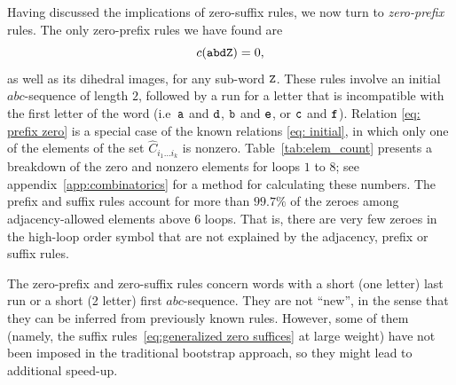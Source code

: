 \documentclass[12pt]{article}
\begin{document}
Having discussed the implications of zero-suffix rules, we now turn to \emph{zero-prefix} rules.  The only zero-prefix rules we have found are
\begin{equation}
\label{eq: prefix zero}
    c({\tt abd Z})=0,
\end{equation}
as well as its dihedral images, for any sub-word ${\tt Z}$. These rules involve an initial $abc$-sequence of length $2$, followed by a run for a letter that is incompatible with the first letter of the word (i.e~${\tt a}$ and ${\tt d}$, ${\tt b}$ and ${\tt e}$, or ${\tt c}$ and ${\tt f}$). Relation \eqref{eq: prefix zero} is a special case of the known relations \eqref{eq: initial}, in which only one of the elements of the set $\hat{C}_{i_1\ldots i_k}$ is nonzero.
Table~\ref{tab:elem_count} presents a breakdown of the zero and nonzero elements for loops $1$ to $8$; see appendix~\ref{app:combinatorics} for a method for calculating these numbers.
The prefix and suffix rules account for more than $99.7\%$ of the zeroes among adjacency-allowed elements above 6 loops. 
That is, there are very few zeroes in the high-loop order symbol that are not explained by the adjacency, prefix or suffix rules.

The zero-prefix and zero-suffix rules concern words with a short (one letter) last run or a short (2 letter) first $abc$-sequence.  They are not ``new'', in the sense that they can be inferred from previously known rules. However, some of them (namely, the suffix rules~\eqref{eq:generalized zero suffices} at large weight) have not been imposed in the traditional bootstrap approach, so they might lead to additional speed-up. 
\end{document}
